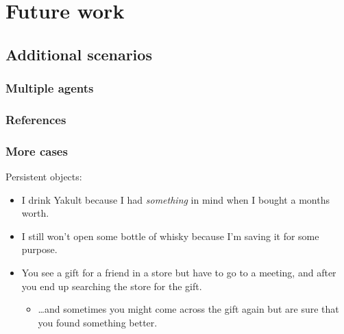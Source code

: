 \documentclass[noamssymb,
]{beamer} %
\begin{document}
\section{Future work}
\label{sec:future-work}




\subsection{Additional scenarios}
\label{sec:final-case}


\begin{frame}
  \frametitle{Multiple agents}

\end{frame}


\appendix

\begin{frame}[noframenumbering]
  \frametitle{References}
  \printbibliography
\end{frame}

\begin{frame}
  \frametitle{More cases}

  Persistent objects:
\begin{itemize}
\item I drink Yakult because I had \emph{something} in mind when I bought a months worth.
\item I still won't open some bottle of whisky because I'm saving it for some purpose.
\item You see a gift for a friend in a store but have to go to a meeting, and after you end up searching the store for the gift.
  \begin{itemize}
  \item \dots and sometimes you might come across the gift again but are sure that you found something better.
  \end{itemize}
\end{itemize}
\end{frame}
\end{document}
